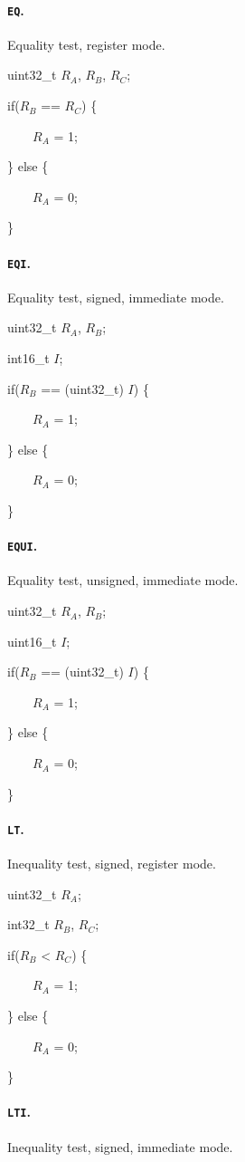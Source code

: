 \documentclass[12pt,english,twoside]{report}
\def\code{\texttt}
\def\subsubsubsection{\paragraph}
\newenvironment{codeblock}
{\begin{list}{}{
\setlength{\rightmargin}{\leftmargin}
\setlength{\listparindent}{0pt}%
\raggedright
\setlength{\itemsep}{0pt}
\setlength{\parsep}{0pt}
\normalfont\ttfamily}%
 \item[]}
{\end{list}}
\begin{document}
\subsubsubsection{\label{sec:Ins_EQ}\code{EQ}.}
Equality test, register mode.

\begin{codeblock}
  uint32\_t $R_A$, $R_B$, $R_C$;

  if($R_B$ == $R_C$) \{

{}~~~~$R_A$ = 1;

  \} else \{

{}~~~~$R_A$ = 0;

  \}
\end{codeblock}

\subsubsubsection{\label{sec:Ins_EQI}\code{EQI}.}
Equality test, signed, immediate mode.

\begin{codeblock}
  uint32\_t $R_A$, $R_B$;

  int16\_t $I$;

  if($R_B$ == (uint32\_t) $I$) \{

{}~~~~$R_A$ = 1;

  \} else \{

{}~~~~$R_A$ = 0;

  \}
\end{codeblock}

\subsubsubsection{\label{sec:Ins_EQUI}\code{EQUI}.}
Equality test, unsigned, immediate mode.

\begin{codeblock}
  uint32\_t $R_A$, $R_B$;

  uint16\_t $I$;

  if($R_B$ == (uint32\_t) $I$) \{

{}~~~~$R_A$ = 1;

  \} else \{

{}~~~~$R_A$ = 0;

  \}
\end{codeblock}

\subsubsubsection{\label{sec:Ins_LT}\code{LT}.}
Inequality test, signed, register mode.

\begin{codeblock}
  uint32\_t $R_A$;

  int32\_t $R_B$, $R_C$;

  if($R_B$ < $R_C$) \{

{}~~~~$R_A$ = 1;

  \} else \{

{}~~~~$R_A$ = 0;

  \}
\end{codeblock}

\subsubsubsection{\label{sec:Ins_LTI}\code{LTI}.}
Inequality test, signed, immediate mode.
\end{document}
